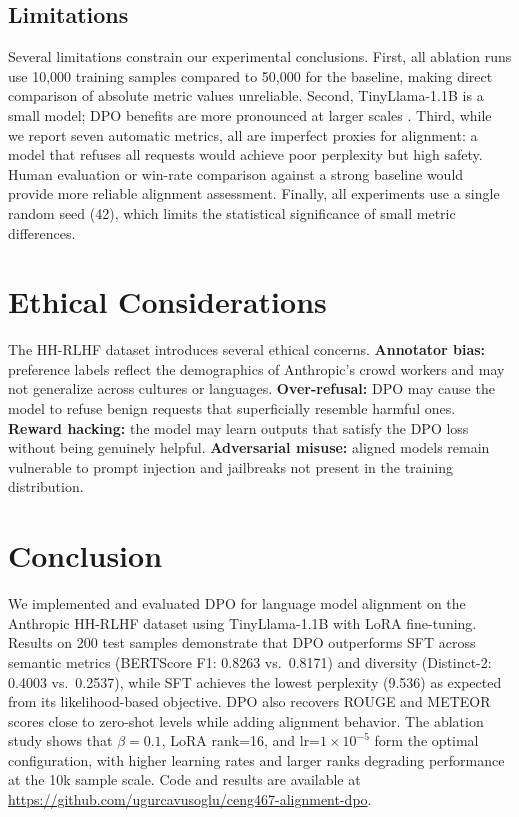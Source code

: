 \documentclass{llncs}
\begin{document}
\subsection{Limitations}

Several limitations constrain our experimental conclusions. First, all ablation
runs use 10,000 training samples compared to 50,000 for the baseline, making direct
comparison of absolute metric values unreliable. Second, TinyLlama-1.1B is a small
model; DPO benefits are more pronounced at larger scales \cite{rafailov2023}.
Third, while we report seven automatic metrics, all are imperfect proxies for
alignment: a model that refuses all requests would achieve poor perplexity but high
safety. Human evaluation
or win-rate comparison against a strong baseline would provide more reliable
alignment assessment. Finally, all experiments use a single random seed (42),
which limits the statistical significance of small metric differences.

\section{Ethical Considerations}

The HH-RLHF dataset introduces several ethical concerns. \textbf{Annotator bias:}
preference labels reflect the demographics of Anthropic's crowd workers and may not
generalize across cultures or languages. \textbf{Over-refusal:} DPO may cause the
model to refuse benign requests that superficially resemble harmful ones.
\textbf{Reward hacking:} the model may learn outputs that satisfy the DPO loss without
being genuinely helpful. \textbf{Adversarial misuse:} aligned models remain vulnerable
to prompt injection and jailbreaks not present in the training distribution.

\section{Conclusion}

We implemented and evaluated DPO for language model alignment on the Anthropic HH-RLHF
dataset using TinyLlama-1.1B with LoRA fine-tuning. Results on 200 test samples
demonstrate that DPO outperforms SFT across semantic metrics (BERTScore F1: 0.8263 vs.\
0.8171) and diversity (Distinct-2: 0.4003 vs.\ 0.2537), while SFT achieves the lowest
perplexity (9.536) as expected from its likelihood-based objective. DPO also recovers
ROUGE and METEOR scores close to zero-shot levels while adding alignment behavior.
The ablation study shows that $\beta=0.1$, LoRA rank=16, and lr=$1\times10^{-5}$
form the optimal configuration, with higher learning rates and larger ranks
degrading performance at the 10k sample scale. Code and results are available at
\url{https://github.com/ugurcavusoglu/ceng467-alignment-dpo}.
\end{document}
